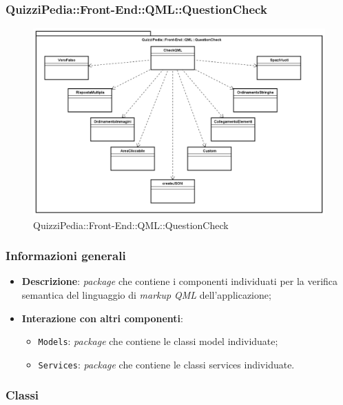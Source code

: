 \newpage
\subsubsection{QuizziPedia::Front-End::QML::QuestionCheck}


\begin{figure} [ht]
	\centering
	\includegraphics[scale=0.45]{UML/Package/QuizziPedia_Front-End_QML_QuestionCheck.png}
	\caption{QuizziPedia::Front-End::QML::QuestionCheck}
\end{figure} \FloatBarrier

\subsubsection{Informazioni generali}
\begin{itemize}
	\item \textbf{Descrizione}: \textit{package} che contiene i componenti individuati per la verifica semantica del linguaggio di \textit{markup} \textit{QML} dell'applicazione;
	\item \textbf{Interazione con altri componenti}:
	\begin{itemize}
		\item \texttt{Models}: \textit{package} che contiene le classi model individuate;
		\item \texttt{Services}: \textit{package} che contiene le classi services individuate.
	\end{itemize} 
\end{itemize}
\subsubsection{Classi}

